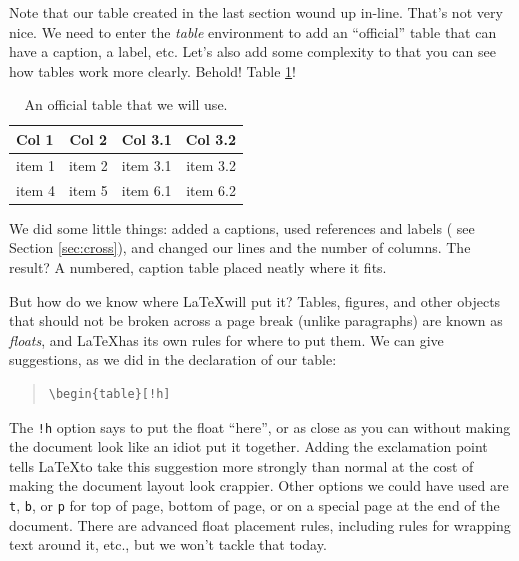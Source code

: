 \documentclass[12pt, letterpaper]{article}
\begin{document}
Note that our table created in the last section wound up in-line.  
That's not very nice.  We need to enter the \emph{table} environment to add 
an ``official'' table that can have a caption, a label, etc.  Let's also add 
some complexity to that you can see how tables work more clearly.  Behold!  
Table \ref{tab:ex1}!

\begin{table}[!h]
  \begin{center}
  \begin{tabular}{|l|c|l r|}
    \hline
    Col 1 & Col 2 & Col 3.1 & Col 3.2\\
    \hline
    \hline
    item 1 & item 2 & item 3.1 & item 3.2\\
    item 4 & item 5 & item 6.1 & item 6.2\\
    \hline
  \end{tabular}
  \caption{An official table that we will use.}
  \label{tab:ex1}
  \end{center}
\end{table}

We did some little things: added a captions, used references and labels (
see Section \ref{sec:cross}), and changed our lines and the number of columns.
The result?  A numbered, caption table placed neatly where it fits.

But how do we know where \LaTeX will put it?  Tables, figures, and other 
objects that should not be broken across a page break (unlike paragraphs) are 
known as \emph{floats}, and \LaTeX has its own rules for where to put them.  
We can give suggestions, as we did in the declaration of our table:
\begin{quote}
\begin{verbatim}
\begin{table}[!h]
\end{verbatim}
\end{quote}
The {\tt !h} option says to put the float ``here'', or as close as you can 
without  making the document look like an idiot put it together.  Adding the 
exclamation point tells \LaTeX to take this suggestion more strongly than 
normal at the cost of making the document layout look crappier.  Other options 
we could have used are {\tt t}, {\tt b}, or {\tt p} for top of page, bottom of 
page, or on a special page at the end of the document.  There are advanced 
float placement rules, including rules for wrapping text around it, etc., 
but we won't tackle that today.
\end{document}
